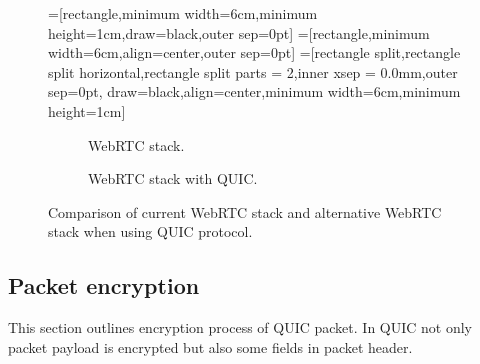\begin{figure}
    \centering
    =[rectangle,minimum width=6cm,minimum height=1cm,draw=black,outer sep=0pt]
    =[rectangle,minimum width=6cm,align=center,outer sep=0pt]
    =[rectangle split,rectangle split horizontal,rectangle split parts = 2,inner xsep = 0.0mm,outer sep=0pt,
    draw=black,align=center,minimum width=6cm,minimum height=1cm]
    \begin{subfigure}[b]{0.4\textwidth}
        \caption{WebRTC stack.}
        \label{fig:webrtc-stack-comparision-standard}
    \end{subfigure}
    \hfill
    \begin{subfigure}[b]{0.4\textwidth}
        \caption{WebRTC stack with QUIC.}
        \label{fig:webrtc-stack-comparision-quic}
    \end{subfigure}
    \caption{Comparison of current WebRTC stack and alternative WebRTC stack when using QUIC protocol.}
    \label{fig:webrtc-stack-comparision}
\end{figure}

\subsection{Packet encryption}
\label{subsec:packet-encryption}
This section outlines encryption process of QUIC packet.
In QUIC not only packet payload is encrypted but also some fields in packet header.

